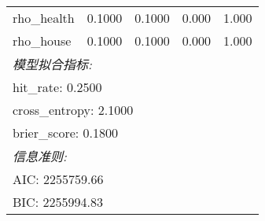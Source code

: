 \begin{table}[htbp]
\begin{tabular}{lcccc}
rho_health & 0.1000 & 0.1000 & 0.000 & 1.000 \\
rho_house & 0.1000 & 0.1000 & 0.000 & 1.000 \\
\midrule
\multicolumn{5}{l}{\textit{模型拟合指标:}} \\
\multicolumn{5}{l}{\quad hit_rate: 0.2500} \\
\multicolumn{5}{l}{\quad cross_entropy: 2.1000} \\
\multicolumn{5}{l}{\quad brier_score: 0.1800} \\
\multicolumn{5}{l}{\textit{信息准则:}} \\
\multicolumn{5}{l}{\quad AIC: 2255759.66} \\
\multicolumn{5}{l}{\quad BIC: 2255994.83} \\
\bottomrule
\end{tabular}
\end{table}
